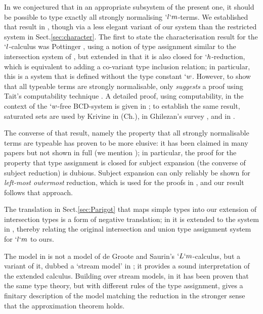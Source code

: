 \documentclass{CSML}
\begin{document}
In \cite{Bakel-Barbanera-deLiguoro-TLCA'11} we conjectured that in an appropriate subsystem of the present one, it should be possible to type exactly all strongly normalising $`l`m$-terms.
We established that result in \cite{BakBdL-ITRS12}, though via a less elegant variant of our system than the restricted system in Sect.\skp\ref{sec:character}.
The first to state the characterisation result for the $`l$-calculus was Pottinger \cite{Pottinger'80}, using a notion of type assignment similar to the intersection system of \cite{Coppo-Dezani'78,Coppo-Dezani-Venneri'80}, but extended in that it is also closed for $`h$-reduction, which is equivalent to adding a co-variant type inclusion relation; in particular, this is a system that is defined without the type constant $`w$.
However, to show that all typeable terms are strongly normalisable, \cite{Pottinger'80} only \emph{suggests} a proof using Tait's computability technique \cite{Tait'67}.
A detailed proof, using computability, in the context of the $`w$-free BCD-system \cite{BCD'83} is given in \cite{Bakel-TCS'92}; to establish the same result, saturated sets are used by Krivine in \cite{Krivine-book'93} (Ch.), in Ghilezan's survey \cite{Ghilezan'96}, and in \cite{Bakel-ACM'11}.

The converse of that result, namely the property that all strongly normalisable terms are typeable has proven to be more elusive: it has been claimed in many papers but not shown in full (we mention \cite{Pottinger'80,Bakel-TCS'92,Ghilezan'96}); in particular, the proof for the property that type assignment is closed for subject expansion (the converse of subject reduction) is dubious.
Subject expansion can only reliably be shown for \emph{left-most outermost} reduction, which is used for the proofs in \cite{Krivine-book'93,Bakel-Dezani-LATIN'02,Bakel-NDJFL'04,Bakel-ACM'11}, and our result follows that approach.

The translation in Sect.\skp\ref{sec:Parigot} that maps simple types into our extension of intersection types is a form of negative translation; in \cite{KikSak14} it is extended to the system in \cite{Bakel-ITRS'10}, thereby relating the original intersection and union type assignment system for $`l`m$ to ours.

The model in \cite{Streicher-Reus'98} is not a model of de Groote and Saurin's $`L`m$-calculus, but a variant of it, dubbed a `stream model' in \cite{NakazawaK-CLC12}; it provides a sound interpretation of the extended calculus. 
Building over stream models, in \cite{deLiguoro:ApproxLM12} it has been proven that the same type theory, but with different rules of the type assignment, gives a finitary description of the model matching the reduction in the stronger sense that the approximation theorem holds.
\end{document}
